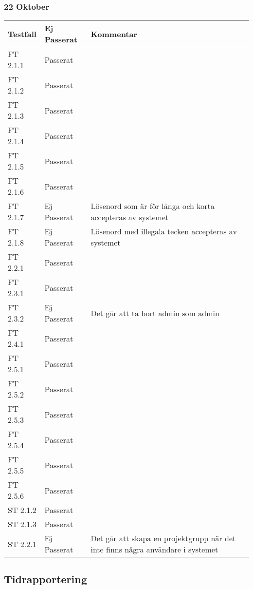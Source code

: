 \documentclass[a4paper]{article}
\begin{document}
\subsubsection{22 Oktober}
\begin{tabular}{| l | l | p{9cm} |}
\hline
Testfall &  Ej Passerat & Kommentar\\
\hline
FT 2.1.1 & Passerat & \\
\hline
FT 2.1.2 & Passerat & \\
\hline
FT 2.1.3 & Passerat & \\
\hline
FT 2.1.4 & Passerat & \\
\hline
FT 2.1.5 & Passerat & \\
\hline
FT 2.1.6 & Passerat & \\
\hline
FT 2.1.7 & Ej Passerat & Lösenord som är för långa och korta accepteras av systemet \\
\hline
FT 2.1.8 & Ej Passerat & Lösenord med illegala tecken accepteras av systemet \\
\hline
FT 2.2.1 & Passerat & \\
\hline
FT 2.3.1 & Passerat & \\
\hline
FT 2.3.2 & Ej Passerat & Det går att ta bort admin som admin\\
\hline
FT 2.4.1 & Passerat & \\
\hline
FT 2.5.1 & Passerat & \\
\hline
FT 2.5.2 & Passerat & \\
\hline
FT 2.5.3 & Passerat & \\
\hline
FT 2.5.4 & Passerat & \\
\hline
FT 2.5.5 & Passerat & \\
\hline
FT 2.5.6 & Passerat & \\
\hline
ST 2.1.2 & Passerat & \\
\hline
ST 2.1.3 & Passerat & \\
\hline
ST 2.2.1 & Ej Passerat & Det går att skapa en projektgrupp när det inte finns några användare i systemet\\
\hline
\end{tabular}








\subsection{Tidrapportering}
\end{document}
